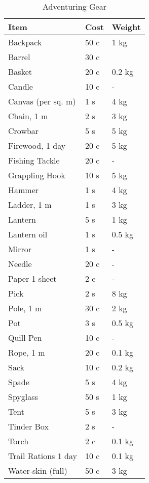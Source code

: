 \documentclass[a4paper,11pt,oneside]{book}
\begin{document}
\begin{table}[ht]
	\centering
	\caption{Adventuring Gear}
	\begin{tabular}{|l|l|l|}
		\hline
		Item & Cost & Weight\\ [0.5ex]
		\hline
		Backpack & 50 c & 1 kg\\
		Barrel & 30 c & \\
		Basket & 20 c & 0.2 kg\\
		Candle & 10 c & -\\
		Canvas (per sq. m) & 1 s & 4 kg\\
		Chain, 1 m & 2 s & 3 kg\\
		Crowbar & 5 s & 5 kg\\
		Firewood, 1 day & 20 c & 5 kg\\
		Fishing Tackle & 20 c & -\\
		Grappling Hook & 10 s & 5 kg\\
		Hammer & 1 s & 4 kg\\
		Ladder, 1 m & 1 s & 3 kg\\
		Lantern & 5 s & 1 kg\\
		Lantern oil & 1 s & 0.5 kg \\
		Mirror & 1 s & -\\
		Needle & 20 c & -\\
		Paper 1 sheet & 2 c & -\\
		Pick & 2 s & 8 kg\\
		Pole, 1 m & 30 c & 2 kg\\
		Pot & 3 s & 0.5 kg\\
		Quill Pen & 10 c & -\\
		Rope, 1 m & 20 c & 0.1 kg\\
		Sack & 10 c & 0.2 kg\\
		Spade & 5 s & 4 kg\\
		Spyglass & 50 s & 1 kg\\
		Tent & 5 s & 3 kg\\
		Tinder Box & 2 s & -\\
		Torch & 2 c & 0.1 kg\\
		Trail Rations 1 day & 10 c & 0.1 kg\\
		Water-skin (full) & 50 c & 3 kg\\		
		\hline
	\end{tabular}
\end{table}
\end{document}
